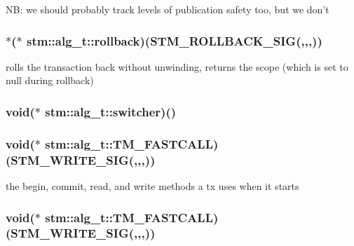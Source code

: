 N\-B\-: we should probably track levels of publication safety too, but we don't \hypertarget{structstm_1_1alg__t_a3238dd576cb31ed3eadeecd302c407ce}{
\subsubsection[{rollback}]{$\ast$($\ast$  stm\-::alg\-\_\-t\-::rollback)({\bf S\-T\-M\-\_\-\-R\-O\-L\-L\-B\-A\-C\-K\-\_\-\-S\-I\-G}(,,,))}}\label{structstm_1_1alg__t_a3238dd576cb31ed3eadeecd302c407ce}
rolls the transaction back without unwinding, returns the scope (which is set to null during rollback) \hypertarget{structstm_1_1alg__t_ab76cab355e3c65c37a7ebd986b4e861b}{
\subsubsection[{switcher}]{\setlength{\rightskip}{0pt plus 5cm}void($\ast$  stm\-::alg\-\_\-t\-::switcher)()}}\label{structstm_1_1alg__t_ab76cab355e3c65c37a7ebd986b4e861b}
\hypertarget{structstm_1_1alg__t_a681b0b7426758442fa7dfba4dbc86b18}{
\subsubsection[{T\-M\-\_\-\-F\-A\-S\-T\-C\-A\-L\-L}]{\setlength{\rightskip}{0pt plus 5cm}void($\ast$ stm\-::alg\-\_\-t\-::\-T\-M\-\_\-\-F\-A\-S\-T\-C\-A\-L\-L)({\bf S\-T\-M\-\_\-\-W\-R\-I\-T\-E\-\_\-\-S\-I\-G}(,,,))}}\label{structstm_1_1alg__t_a681b0b7426758442fa7dfba4dbc86b18}
the begin, commit, read, and write methods a tx uses when it starts \hypertarget{structstm_1_1alg__t_ae2a36e94732bda4c2f3e9bbadc870e3e}{
\subsubsection[{T\-M\-\_\-\-F\-A\-S\-T\-C\-A\-L\-L}]{\setlength{\rightskip}{0pt plus 5cm}void($\ast$ stm\-::alg\-\_\-t\-::\-T\-M\-\_\-\-F\-A\-S\-T\-C\-A\-L\-L)({\bf S\-T\-M\-\_\-\-W\-R\-I\-T\-E\-\_\-\-S\-I\-G}(,,,))}}\label{structstm_1_1alg__t_ae2a36e94732bda4c2f3e9bbadc870e3e}

